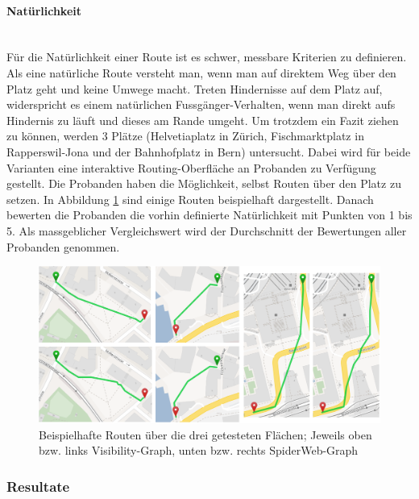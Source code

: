 \paragraph{Natürlichkeit}\label{criteria:Natürlichkeit}~\\
Für die Natürlichkeit einer Route ist es schwer, messbare Kriterien zu definieren. Als eine natürliche Route versteht man, wenn man auf direktem Weg über den Platz geht und keine Umwege macht. Treten Hindernisse auf dem Platz auf, widerspricht es einem natürlichen Fussgänger-Verhalten, wenn man direkt aufs Hindernis zu läuft und dieses am Rande umgeht. Um trotzdem ein Fazit ziehen zu können, werden 3 Plätze (Helvetiaplatz in Zürich, Fischmarktplatz in Rapperswil-Jona und der Bahnhofplatz in Bern) untersucht. Dabei wird für beide Varianten eine interaktive Routing-Oberfläche an Probanden zu Verfügung gestellt. Die Probanden haben die Möglichkeit, selbst Routen über den Platz zu setzen. In Abbildung \ref{fig:algorithm-example-routes} sind einige Routen beispielhaft dargestellt. Danach bewerten die Probanden die vorhin definierte Natürlichkeit mit Punkten von 1 bis 5. Als massgeblicher Vergleichswert wird der Durchschnitt der Bewertungen aller Probanden genommen.

\begin{figure}[ht]
    \centering
    \includegraphics[width=1\linewidth]{technicalreport/img/algorithm-comparison-routes}
    \caption[Beispielhafte Routen für Natürlichkeits-Test]{Beispielhafte Routen über die drei getesteten Flächen; Jeweils oben bzw. links Visibility-Graph, unten bzw. rechts SpiderWeb-Graph}
    \label{fig:algorithm-example-routes}
\end{figure}


\subsubsection{Resultate}
\label{eval:Resultate}

